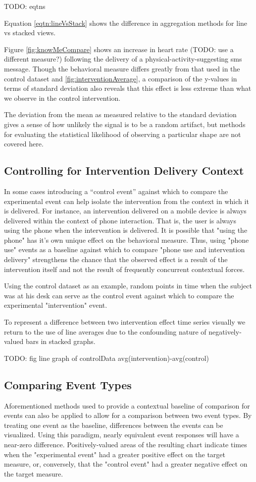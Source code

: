 \documentclass[review,journal]{vgtc}         %
\begin{document}
TODO: eqtns

Equation \ref{eqtn:lineVsStack} shows the difference in aggregation methods for line vs stacked views.

Figure \ref{fig:knowMeCompare} shows an increase in heart rate (TODO: use a different measure?) following the delivery of a physical-activity-suggesting sms message.
Though the behavioral measure differs greatly from that used in the control dataset and \ref{fig:interventionAverage}, a comparison of the y-values in terms of standard deviation also reveals that this effect is less extreme than what we observe in the control intervention.

The deviation from the mean as measured relative to the standard deviation gives a sense of how unlikely the signal is to be a random artifact, but methods for evaluating the statistical likelihood of observing a particular shape are not covered here.

\subsection{Controlling for Intervention Delivery Context}
In some cases introducing a “control event” against which to compare the experimental event can help isolate the intervention from the context in which it is delivered.
For instance, an intervention delivered on a mobile device is always delivered within the context of phone interaction.
That is, the user is always using the phone when the intervention is delivered.
It is possible that "using the phone" has it's own unique effect on the behavioral measure.
Thus, using "phone use" events as a baseline against which to compare "phone use and intervention delivery" strengthens the chance that the observed effect is a result of the intervention itself and not the result of frequently concurrent contextual forces.

Using the control dataset as an example, random points in time when the subject was at his desk can serve as the control event against which to compare the experimental "intervention" event.

To represent a difference between two intervention effect time series visually we return to the use of line averages due to the confounding nature of negatively-valued bars in stacked graphs.

TODO: fig line graph of controlData avg(intervention)-avg(control)


\subsection{Comparing Event Types}
Aforementioned methods used to provide a contextual baseline of comparison for events can also be applied to allow for a comparison between two event types.
By treating one event as the baseline, differences between the events can be visualized.
Using this paradigm, nearly equivalent event responses will have a near-zero difference.
Positively-valued areas of the resulting chart indicate times when the "experimental event" had a greater positive effect on the target measure, or, conversely, that the "control event" had a greater negative effect on the target measure.
\end{document}
